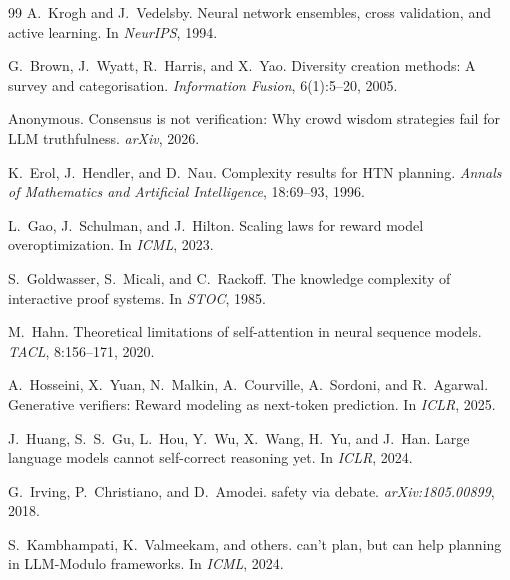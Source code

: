 \documentclass{article}
\theoremstyle{definition}
\theoremstyle{remark}
\begin{document}
\begin{thebibliography}{99}
A.~Krogh and J.~Vedelsby.
\newblock Neural network ensembles, cross validation, and active learning.
\newblock In \emph{NeurIPS}, 1994.

G.~Brown, J.~Wyatt, R.~Harris, and X.~Yao.
\newblock Diversity creation methods: A survey and categorisation.
\newblock \emph{Information Fusion}, 6(1):5--20, 2005.

Anonymous.
\newblock Consensus is not verification: Why crowd wisdom strategies fail for {LLM} truthfulness.
\newblock \emph{arXiv}, 2026.

K.~Erol, J.~Hendler, and D.~Nau.
\newblock Complexity results for {HTN} planning.
\newblock \emph{Annals of Mathematics and Artificial Intelligence}, 18:69--93, 1996.

L.~Gao, J.~Schulman, and J.~Hilton.
\newblock Scaling laws for reward model overoptimization.
\newblock In \emph{ICML}, 2023.

S.~Goldwasser, S.~Micali, and C.~Rackoff.
\newblock The knowledge complexity of interactive proof systems.
\newblock In \emph{STOC}, 1985.

M.~Hahn.
\newblock Theoretical limitations of self-attention in neural sequence models.
\newblock \emph{TACL}, 8:156--171, 2020.

A.~Hosseini, X.~Yuan, N.~Malkin, A.~Courville, A.~Sordoni, and R.~Agarwal.
\newblock Generative verifiers: Reward modeling as next-token prediction.
\newblock In \emph{ICLR}, 2025.

J.~Huang, S.~S.~Gu, L.~Hou, Y.~Wu, X.~Wang, H.~Yu, and J.~Han.
\newblock Large language models cannot self-correct reasoning yet.
\newblock In \emph{ICLR}, 2024.

G.~Irving, P.~Christiano, and D.~Amodei.
 safety via debate.
\newblock \emph{arXiv:1805.00899}, 2018.

S.~Kambhampati, K.~Valmeekam, and others.
 can't plan, but can help planning in {LLM-Modulo} frameworks.
\newblock In \emph{ICML}, 2024.


\end{thebibliography}
\end{document}
